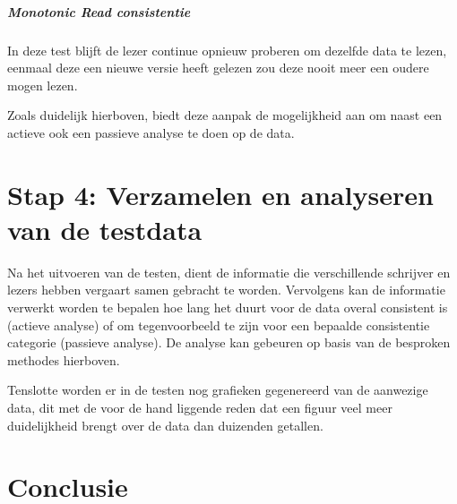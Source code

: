 \subparagraph{Monotonic Read consistentie} In deze test blijft de lezer continue opnieuw proberen om dezelfde data te lezen, eenmaal deze een nieuwe versie heeft gelezen zou deze nooit meer een oudere mogen lezen. 

Zoals duidelijk hierboven, biedt deze aanpak de mogelijkheid aan om naast een actieve ook een passieve analyse te doen op de data. 

\section{Stap 4: Verzamelen en analyseren van de testdata}
Na het uitvoeren van de testen, dient de informatie die verschillende schrijver en lezers hebben vergaart samen gebracht te worden. Vervolgens kan de informatie verwerkt worden te bepalen hoe lang het duurt voor de data overal consistent is (actieve analyse) of om  tegenvoorbeeld te zijn voor een bepaalde consistentie categorie (passieve analyse). De analyse kan gebeuren op basis van de besproken methodes hierboven. 

Tenslotte worden er in de testen nog grafieken gegenereerd van de aanwezige data, dit met de voor de hand liggende reden dat een figuur veel meer duidelijkheid brengt over de data dan duizenden getallen.  

\section{Conclusie}
